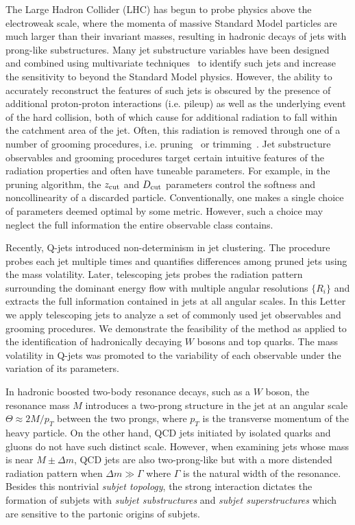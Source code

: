 \documentclass[aps,prl,floatfix,preprintnumbers,twocolumn,groupedaddress,nofootinbib]{revtex4-1}
\begin{document}
The Large Hadron Collider (LHC) has begun to probe physics above the electroweak scale, where the momenta of massive Standard Model particles are much larger than their invariant masses, resulting in hadronic decays of jets with prong-like substructures. Many jet substructure variables have been designed~\cite{Abdesselam:2010pt,Altheimer:2012mn,Altheimer:2013yza} and combined using multivariate techniques~\cite{Adams:2015hiv,Larkoski:2017jix,ATLAS-CONF-2017-064,Khachatryan:1955546} to identify such jets and increase the sensitivity to beyond the Standard Model physics. However, the ability to accurately reconstruct the features of such jets is obscured by the presence of additional proton-proton interactions (i.e. pileup) as well as the underlying event of the hard collision, both of which cause for additional radiation to fall within the catchment area of the jet.  Often, this radiation is removed through one of a number of grooming procedures, i.e. pruning~\cite{Ellis:2009su} or trimming~\cite{Krohn:2009th}.  Jet substructure observables and grooming procedures target certain intuitive features of the radiation properties and often have tuneable parameters.  For example, in the pruning algorithm, the $z_{\rm cut}$ and $D_{\rm cut}$ parameters control the softness and noncollinearity of a discarded particle. Conventionally, one makes a single choice of parameters deemed optimal by some metric.  However, such a choice may neglect the full information the entire observable class contains.

Recently, Q-jets \cite{Ellis:2012sn} introduced non-determinism in jet clustering. The procedure probes each jet multiple times and quantifies differences among pruned jets using the mass volatility. Later, telescoping jets \cite{Chien:2014hla} probes the radiation pattern surrounding the dominant energy flow with multiple angular resolutions $\{R_i\}$ and extracts the full information contained in jets at all angular scales. In this Letter we apply telescoping jets to analyze a set of commonly used jet observables and grooming procedures. We demonstrate the feasibility of the method as applied to the identification of hadronically decaying $W$ bosons and top quarks. The mass volatility in Q-jets was promoted to the variability of each observable under the variation of its parameters.

In hadronic boosted two-body resonance decays, such as a $W$ boson, the resonance mass $M$ introduces a two-prong structure in the jet at an angular scale $\Theta\approx 2M/p_T$ between the two prongs, where $p_T$ is the transverse momentum of the heavy particle. On the other hand, QCD jets initiated by isolated quarks and gluons do not have such distinct scale. However, when examining jets whose mass is near $M\pm\Delta m$, QCD jets are also two-prong-like but with a more distended radiation pattern when $\Delta m\gg\Gamma$ where $\Gamma$ is the natural width of the resonance. Besides this nontrivial {\sl subjet topology}, the strong interaction dictates the formation of subjets with {\sl subjet substructures} and {\sl subjet superstructures} \cite{Gallicchio:2010sw} which are sensitive to the partonic origins of subjets.
\end{document}
